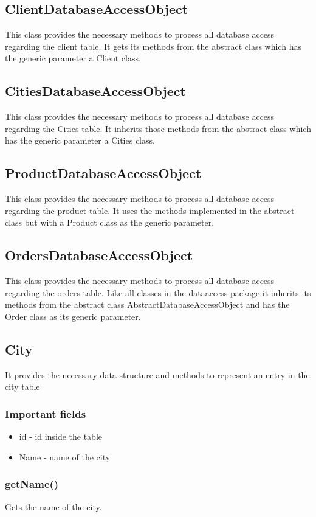 \documentclass[10pt,a4paper]{article}
\begin{document}
\subsection{ClientDatabaseAccessObject}
This class provides the necessary methods to process all database access regarding the client table. It gets its methods from the abstract class which has the generic parameter a Client class.

\subsection{CitiesDatabaseAccessObject}
This class provides the necessary methods to process all database access regarding the Cities table. It inherits those methods from the abstract class which has the generic parameter a Cities class.

\subsection{ProductDatabaseAccessObject}
This class provides the necessary methods to process all database access regarding the product table. It uses the methods implemented in the abstract class but with a Product class as the generic parameter.

\subsection{OrdersDatabaseAccessObject}
This class provides the necessary methods to process all database access regarding the orders table. Like all classes in the dataaccess package it inherits its methods from the abstract class AbstractDatabaseAccessObject and has the Order class as its generic parameter.

\subsection{City}
It provides the necessary data structure and methods to represent an entry in the city table
\subsubsection{Important fields}
\begin{itemize}
\item id - id inside the table
\item Name - name of the city
\end{itemize}
\subsubsection{getName()}
Gets the name of the city.
\end{document}

